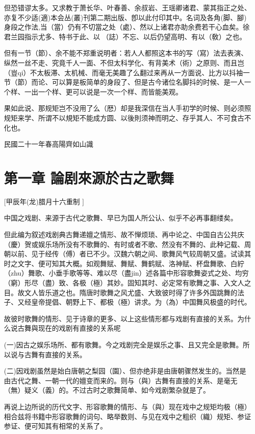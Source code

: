 \documentclass{zhvt-classic}
\begin{document}
但恐错谬太多。又求教于萧长华、叶春善、余叔岩、王瑶卿诸君、蒙其指正之处、亦复不少适(適)本会丛(叢)刊第二期出版、卽以此付印其中。名词及各角(脚、腳)身段之作法,当（當）仍有不切當之处（處）、然以上诸君亦助余费若干心血矣。徐君兰园指示尤多、特书于此、以𰵧（誌）不忘、以后仍望高明、有以（敎）之也。

但有一节（節）、余不能不郑重说明者：若人人都照这本书的写（寫）法去表演、纵然一丝不走、究竟千人一面、不但太科学化、有背美术（術）之原则、而且岂（豈qi）不太板滞、太机械、而毫无美趣了么翻过来再从一方面说、比方以抖袖一节（節）而论、可以算是板简单的身段了、但是古今诸位名脚抖的时候、是一人一个样、一出一个样、更可以说是一次一个样、而皆能美观。

果如此说、那规矩岂不没用了么（厯）却是我深信在当人手初学的时候、则必须照规矩来学、所谓不以規矩不能成方圆、以後則须神而明之、存乎其人、不可食古不化也。

民國二十一年春高陽齊如山識

\chapter*[]{第一章 論剧來源於古之歌舞}[甲辰年(龙)腊月十六重制
]
\begin{preface}
中国之戏剧、来源于古代之歌舞、早已为国人所公认、似乎不必再事翻缕矣。
\end{preface}

但此编为叙述戏剧典古舞递嬗之情形、故不惮烦琐、再中论之、中国自古公共庆（慶）贺或娱乐场所没有不歌舞的、有时或者不歌、然没有不舞的、此种记载、周朝以前、见于经传（傅）者已不少。汉魏六朝之间、歌舞风气较周朝又盛。试读其时之文字、便可知其大概。如观舞赋、舞赋、舞鹤赋、洛神赋、杯盘舞歌、白紵（zhu）舞歌、小垂手歌等等、难以尽（盡jin）述各篇中形容歌舞姿式之处、均穷（窮）形尽（盡）致、各极（極）其妙。固知其时、必定常有歌舞之事、入文人之目。故文人皆乐道之也。隋唐时歌舞之风尤盛、大致彼时得了许多外国跳舞的法子、又经皇帝提倡、朝野上下、都极（極）讲求。为（為）中国舞风极盛的时代。

故彼时歌舞的情形、见于诗章的更多、以上这些情形都与戏剧有直接的关系。为什么说古舞與现在的戏剧有直接的关系呢

(一)因古之娱乐场所、都有歌舞。今之戏剧完全是娱乐之事、且又完全是歌舞。所以说与古舞有直接的关系。

(二)因戏剧虽然是始白唐朝之梨园（園）、但亦绝非是由唐朝骤然发生的。当然是由古代之舞、一朝一代的嬗变而来的。则与（與）古舞有直接的关系、是毫无（無）疑义（義）的。不过古时之歌舞简单、如今戏剧繁杂就是了。

再说上边所说的历代文字、形容歌舞的情形、与（與）现在戏中之规矩均极（極）相合兹将书籍中形容歌舞的词句、略举数则、与见在戏中之粗织（織）规矩、参证参证、便可知其有相常的关系了。
\end{document}
